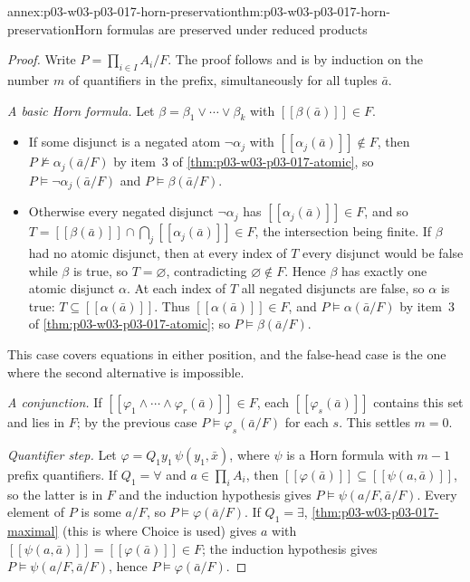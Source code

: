 \begin{annexitem}{annex:p03-w03-p03-017-horn-preservation}{thm:p03-w03-p03-017-horn-preservation}{Horn formulas are preserved under reduced products}
\begin{proof}
Write \(P=\prod_{i\in I}A_i/F\).  The proof follows
\cite[V\S2, Theorem~2.7, pp.~207--210]{BurrisSankappanavar2012} and is by
induction on the number \(m\) of quantifiers in the prefix, simultaneously
for all tuples \(\bar a\).

\emph{A basic Horn formula.}  Let
\(\beta=\beta_1\vee\cdots\vee\beta_k\) with \([\![\beta(\bar a)]\!]\in F\).
\begin{itemize}
  \item If some disjunct is a negated atom \(\neg\alpha_j\) with
        \([\![\alpha_j(\bar a)]\!]\notin F\), then \(P\not\models\alpha_j(\bar
        a/F)\) by item~3 of \cref{thm:p03-w03-p03-017-atomic}, so
        \(P\models\neg\alpha_j(\bar a/F)\) and \(P\models\beta(\bar a/F)\).
  \item Otherwise every negated disjunct \(\neg\alpha_j\) has
        \([\![\alpha_j(\bar a)]\!]\in F\), and so
        \(T=[\![\beta(\bar a)]\!]\cap\bigcap_j[\![\alpha_j(\bar a)]\!]\in F\),
        the intersection being finite.  If \(\beta\) had no atomic disjunct,
        then at every index of \(T\) every disjunct would be false while
        \(\beta\) is true, so \(T=\varnothing\), contradicting
        \(\varnothing\notin F\).  Hence \(\beta\) has exactly one atomic
        disjunct \(\alpha\).  At each index of \(T\) all negated disjuncts
        are false, so \(\alpha\) is true: \(T\subseteq[\![\alpha(\bar a)]\!]\).
        Thus \([\![\alpha(\bar a)]\!]\in F\), and \(P\models\alpha(\bar a/F)\)
        by item~3 of \cref{thm:p03-w03-p03-017-atomic}; so
        \(P\models\beta(\bar a/F)\).
\end{itemize}
This case covers equations in either position, and the false-head case is
the one where the second alternative is impossible.

\emph{A conjunction.}  If \([\![\varphi_1\wedge\cdots\wedge\varphi_r(\bar
a)]\!]\in F\), each \([\![\varphi_s(\bar a)]\!]\) contains this set and lies
in \(F\); by the previous case \(P\models\varphi_s(\bar a/F)\) for each
\(s\).  This settles \(m=0\).

\emph{Quantifier step.}  Let \(\varphi=Q_1y_1\,\psi(y_1,\bar x)\), where
\(\psi\) is a Horn formula with \(m-1\) prefix quantifiers.  If \(Q_1=\forall\)
and \(a\in\prod_iA_i\), then
\([\![\varphi(\bar a)]\!]\subseteq[\![\psi(a,\bar a)]\!]\), so the latter is
in \(F\) and the induction hypothesis gives \(P\models\psi(a/F,\bar a/F)\).
Every element of \(P\) is some \(a/F\), so \(P\models\varphi(\bar a/F)\).  If
\(Q_1=\exists\), \cref{thm:p03-w03-p03-017-maximal} (this is where Choice is
used) gives \(a\) with \([\![\psi(a,\bar a)]\!]=[\![\varphi(\bar a)]\!]\in F\);
the induction hypothesis gives \(P\models\psi(a/F,\bar a/F)\), hence
\(P\models\varphi(\bar a/F)\).
\end{proof}
\end{annexitem}

